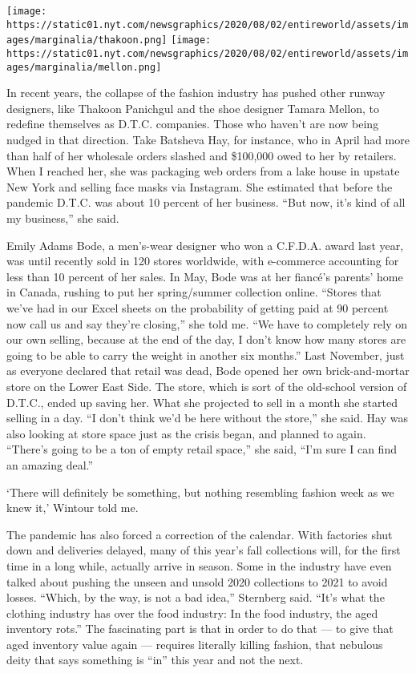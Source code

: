 \texttt{[image: https://static01.nyt.com/newsgraphics/2020/08/02/entireworld/assets/images/marginalia/thakoon.png]}
\texttt{[image: https://static01.nyt.com/newsgraphics/2020/08/02/entireworld/assets/images/marginalia/mellon.png]}

In recent years, the collapse of the fashion industry has pushed other
runway designers, like Thakoon Panichgul and the shoe designer Tamara
Mellon, to redefine themselves as D.T.C. companies. Those who haven't
are now being nudged in that direction. Take Batsheva Hay, for instance,
who in April had more than half of her wholesale orders slashed and
\$100,000 owed to her by retailers. When I reached her, she was
packaging web orders from a lake house in upstate New York and selling
face masks via Instagram. She estimated that before the pandemic D.T.C.
was about 10 percent of her business. ``But now, it's kind of all my
business,'' she said.

Emily Adams Bode, a men's-wear designer who won a C.F.D.A. award last
year, was until recently sold in 120 stores worldwide, with e-commerce
accounting for less than 10 percent of her sales. In May, Bode was at
her fiancé's parents' home in Canada, rushing to put her spring/summer
collection online. ``Stores that we've had in our Excel sheets on the
probability of getting paid at 90 percent now call us and say they're
closing,'' she told me. ``We have to completely rely on our own selling,
because at the end of the day, I don't know how many stores are going to
be able to carry the weight in another six months.'' Last November, just
as everyone declared that retail was dead, Bode opened her own
brick-and-mortar store on the Lower East Side. The store, which is sort
of the old-school version of D.T.C., ended up saving her. What she
projected to sell in a month she started selling in a day. ``I don't
think we'd be here without the store,'' she said. Hay was also looking
at store space just as the crisis began, and planned to again. ``There's
going to be a ton of empty retail space,'' she said, ``I'm sure I can
find an amazing deal.''

`There will definitely be something, but nothing resembling fashion week
as we knew it,' Wintour told me.

The pandemic has also forced a correction of the calendar. With
factories shut down and deliveries delayed, many of this year's fall
collections will, for the first time in a long while, actually arrive in
season. Some in the industry have even talked about pushing the unseen
and unsold 2020 collections to 2021 to avoid losses. ``Which, by the
way, is not a bad idea,'' Sternberg said. ``It's what the clothing
industry has over the food industry: In the food industry, the aged
inventory rots.'' The fascinating part is that in order to do that ---
to give that aged inventory value again --- requires literally killing
fashion, that nebulous deity that says something is ``in'' this year and
not the next.

